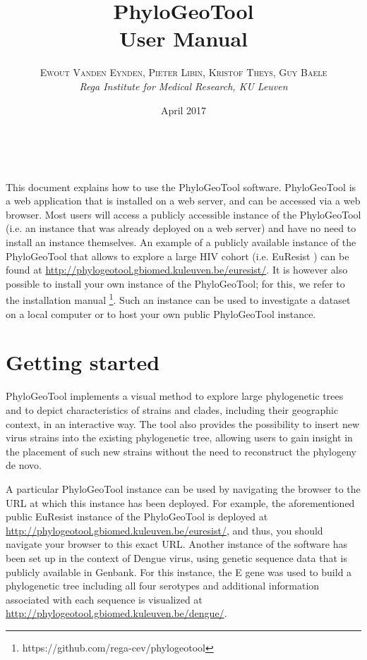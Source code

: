 \documentclass[a4paper, 11pt]{article} %
\title{\textbf{PhyloGeoTool}\\ %
User Manual} %
\author{\textsc{Ewout Vanden Eynden, Pieter Libin, Kristof Theys, Guy Baele} %
\\{\textit{Rega Institute for Medical Research, KU Leuven}}} %
\date{April 2017} %
\makeatletter
\renewcommand{\maketitle}{ %
\begin{flushright} %
{\LARGE\@title} %

\vspace{50pt} %

{\large\@author} %
\\\@date %

\vspace{40pt} %
\end{flushright}
}
\makeatother
\begin{document}
\maketitle %


\vspace{30pt} %

\tableofcontents
\newpage

This document explains how to use the PhyloGeoTool software. 
PhyloGeoTool is a web application that is installed on a web server, and can be accessed via a web browser. 
Most users will access a publicly accessible instance of the PhyloGeoTool (i.e. an instance that was already deployed on a web server) and have no need to install an instance themselves. 
An example of a publicly available instance of the PhyloGeoTool that allows to explore a large HIV cohort (i.e. EuResist \cite{Zazzi2012}) can be found at \url{http://phylogeotool.gbiomed.kuleuven.be/euresist/}.
It is however also possible to install your own instance of the PhyloGeoTool; for this, we refer to the installation manual \footnote{https://github.com/rega-cev/phylogeotool}. 
Such an instance can be used to investigate a dataset on a local computer or to host your own public PhyloGeoTool instance.


\section{Getting started}

PhyloGeoTool implements a visual method to explore large phylogenetic trees and to depict characteristics of strains and clades, including their geographic context, in an interactive way.
The tool also provides the possibility to insert new virus strains into the existing phylogenetic tree, allowing users to gain insight in the placement of such new strains without the need to reconstruct the phylogeny de novo.

A particular PhyloGeoTool instance can be used by navigating the browser to the URL at which this instance has been deployed. 
For example, the aforementioned public EuResist instance of the PhyloGeoTool is deployed at \url{http://phylogeotool.gbiomed.kuleuven.be/euresist/}, and thus, you should navigate your browser to this exact URL. 
Another instance of the software has been set up in the context of Dengue virus, using genetic sequence data that is publicly available in Genbank. 
For this instance, the E gene was used to build a phylogenetic tree including all four serotypes and additional information associated with each sequence is visualized at \url{http://phylogeotool.gbiomed.kuleuven.be/dengue/}.  
\end{document}
